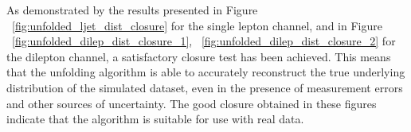 As demonstrated by the results presented in Figure %
~\ref{fig:unfolded_ljet_dist_closure} for the single lepton channel, and in 
Figure ~\ref{fig:unfolded_dilep_dist_closure_1}, ~\ref{fig:unfolded_dilep_dist_closure_2} 
for the dilepton channel, a satisfactory closure test has been achieved. This means that the unfolding algorithm is able to accurately reconstruct the true underlying distribution of the simulated dataset, even in the presence of measurement errors and other sources of uncertainty. The good closure obtained in these figures indicate that the algorithm is suitable for use with real data.

\begin{figure}[ht]
  \centering
  \quad\quad
  \quad\quad
  \quad\quad

\end{figure}
